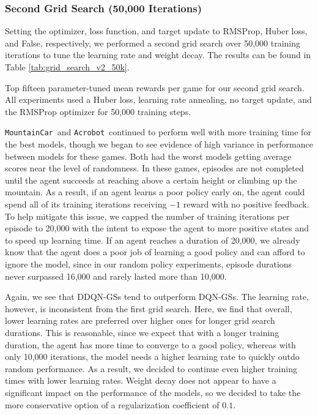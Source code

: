 \documentclass[11pt]{article}
\newcommand{\ab}{\texttt{Acrobot}}
\newcommand{\mc}{\texttt{MountainCar}}
\begin{document}
\subsubsection{Second Grid Search (50,000 Iterations)}
 
Setting the optimizer, loss function, and target update to RMSProp, Huber loss, and False, respectively, we performed a second grid search over 50,000 training iterations to tune the learning rate and weight decay. The results can be found in Table \ref{tab:grid_search_v2_50k}.

\begin{table*}[!ht]
    \footnotesize
    \centering
    
    
    \caption{Top fifteen parameter-tuned mean rewards per game for our second grid search. All experiments used a Huber loss, learning rate annealing, no target update, and the RMSProp optimizer for 50,000 training steps.}
    \label{tab:grid_search_v2_50k}
\end{table*}

\mc~and \ab~continued to perform well with more training time for the best models, though we began to see evidence of high variance in performance between models for these games. Both had the worst models getting average scores near the level of randomness. In these games, episodes are not completed until the agent succeeds at reaching above a certain height or climbing up the mountain. As a result, if an agent learns a poor policy early on, the agent could spend all of its training iterations receiving $-1$ reward with no positive feedback. To help mitigate this issue, we capped the number of training iterations per episode to 20,000 with the intent to expose the agent to more positive states and to speed up learning time. If an agent reaches a duration of 20,000, we already know that the agent does a poor job of learning a good policy and can afford to ignore the model, since in our random policy experiments, episode durations never surpassed 16,000 and rarely lasted more than 10,000.

Again, we see that DDQN-GSs tend to outperform DQN-GSs. The learning rate, however, is inconsistent from the first grid search. Here, we find that overall, lower learning rates are preferred over higher ones for longer grid search durations. This is reasonable, since we expect that with a longer training duration, the agent has more time to converge to a good policy, whereas with only 10,000 iterations, the model needs a higher learning rate to quickly outdo random performance. As a result, we decided to continue even higher training times with lower learning rates. Weight decay does not appear to have a significant impact on the performance of the models, so we decided to take the more conservative option of a regularization coefficient of $0.1$.
\end{document}
